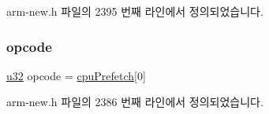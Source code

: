 arm-\/new.\+h 파일의 2395 번째 라인에서 정의되었습니다.

\mbox{\label{arm-new_8h_a4fc220098f4b9d0e039a28274d05c198}} 
\subsubsection{\texorpdfstring{opcode}{opcode}}
{\footnotesize\ttfamily \mbox{\hyperlink{_system_8h_a10e94b422ef0c20dcdec20d31a1f5049}{u32}} opcode = \mbox{\hyperlink{thumb_8h_a697b194786a904a0e87abfe17000dd72}{cpu\+Prefetch}}\mbox{[}0\mbox{]}}



arm-\/new.\+h 파일의 2386 번째 라인에서 정의되었습니다.

